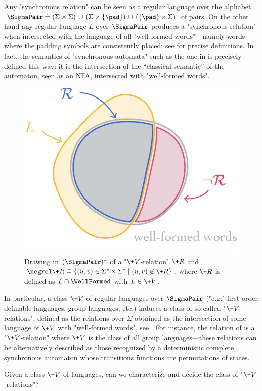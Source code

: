 Any "synchronous relation" can be seen as a regular language over the alphabet
$\SigmaPair \defeq (\Sigma \times \Sigma) \,\cup\,
(\Sigma \times \{\pad\}) \,\cup\, (\{\pad\} \times \Sigma)$ of pairs. On the other hand any regular language $L$ over $\SigmaPair$
produces a "synchronous relation" when intersected with the language of all
"well-formed words"---namely words where the padding symbols are consistently placed;
see  for precise definitions. In fact, the semantics
of "synchronous automata" such as the one in  is precisely defined this way:
it is the intersection of the ``classical semantic'' of the automaton, seen as an NFA, intersected
with "well-formed words".

\begin{figure}[htbp]
	\begin{center}
		\includegraphics[width=.4\linewidth]{fig/algebra/projection.png}
	\end{center}
	\caption{
		\AP\label{fig:projection}
		Drawing in $(\SigmaPair)^*$ of a "$\+V$-relation" $\+R$ and $\negrel\+R \defeq \{(u,v) \in \Sigma^*\times \Sigma^* \mid (u,v) \not\in \+R\}$, where $\+R$ is defined as $L \cap \WellFormed$ with $L \in \+V$.
	} 
\end{figure}

In particular, a class $\+V$ of regular languages over
$\SigmaPair$
("e.g." first-order definable languages, group languages, etc.) induces a class of so-called
"$\+V$-relations", defined as the relations over $\Sigma$ obtained as the intersection of some 
language of $\+V$ with "well-formed words", see .
For instance, the relation of 
is a "$\+V$-relation" where $\+V$ is the class of all group languages---these relations can be 
alternatively described as those recognized by a deterministic complete synchronous automaton whose 
transitions functions are permutations of states.

\begin{question}
	\AP\label{quest:V-relations}
	Given a class $\+V$ of languages, can we characterize and decide the class of "$\+V$-relations"?
\end{question}

